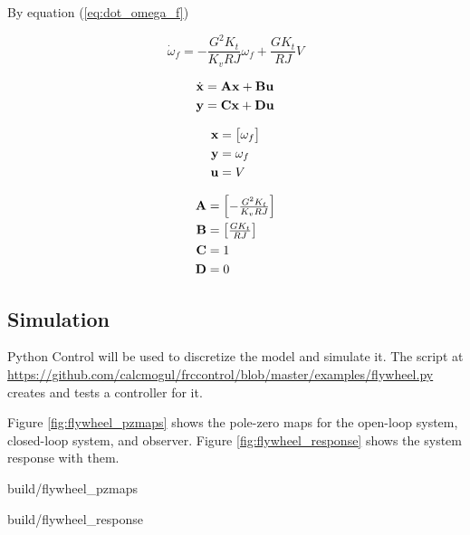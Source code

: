 By equation (\ref{eq:dot_omega_f})

\begin{equation*}
  \dot{\omega}_f = -\frac{G^2 K_t}{K_v RJ} \omega_f + \frac{G K_t}{RJ} V
\end{equation*}

\begin{align*}
  \dot{\mathbf{x}} &= \mathbf{A} \mathbf{x} + \mathbf{B} \mathbf{u} \\
  \mathbf{y} &= \mathbf{C} \mathbf{x} + \mathbf{D} \mathbf{u}
\end{align*}

\begin{align*}
  \mathbf{x} &=
  \begin{bmatrix}
    \omega_f
  \end{bmatrix} \\
  \mathbf{y} &= \omega_f \\
  \mathbf{u} &= V
\end{align*}

\begin{align}
  \mathbf{A} &=
  \begin{bmatrix}
    -\frac{G^2 K_t}{K_v RJ}
  \end{bmatrix} \\
  \mathbf{B} &=
  \begin{bmatrix}
    \frac{G K_t}{RJ}
  \end{bmatrix} \\
  \mathbf{C} &= 1 \\
  \mathbf{D} &= 0
\end{align}

\subsection{Simulation}

Python Control will be used to discretize the model and simulate it. The script
at
\url{https://github.com/calcmogul/frccontrol/blob/master/examples/flywheel.py}
creates and tests a controller for it.

Figure \ref{fig:flywheel_pzmaps} shows the pole-zero maps for the open-loop
system, closed-loop system, and observer. Figure \ref{fig:flywheel_response}
shows the system response with them.

\begin{svg}{build/flywheel_pzmaps}
  \caption{Flywheel pole-zero maps}
  \label{fig:flywheel_pzmaps}
\end{svg}

\begin{svg}{build/flywheel_response}
  \caption{Flywheel response}
  \label{fig:flywheel_response}
\end{svg}

